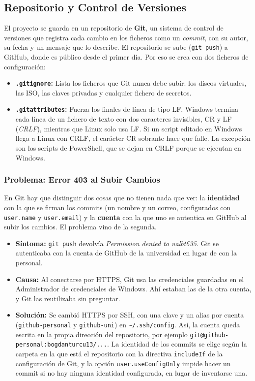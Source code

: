 \documentclass[11pt, a4paper, titlepage]{article}
\newcommand{\cod}[1]{\texttt{#1}}
\begin{document}
\subsection{Repositorio y Control de Versiones}

El proyecto se guarda en un repositorio de \textbf{Git}, un sistema de control de versiones que registra cada cambio en los ficheros como un \textit{commit}, con su autor, su fecha y un mensaje que lo describe. El repositorio se sube (\cod{git push}) a GitHub, donde es público desde el primer día. Por eso se crea con dos ficheros de configuración:

\begin{itemize}
    \item \textbf{\cod{.gitignore}:} Lista los ficheros que Git nunca debe subir: los discos virtuales, las ISO, las claves privadas y cualquier fichero de secretos.
    \item \textbf{\cod{.gitattributes}:} Fuerza los finales de línea de tipo LF. Windows termina cada línea de un fichero de texto con dos caracteres invisibles, CR y LF (\textit{CRLF}), mientras que Linux solo usa LF. Si un script editado en Windows llega a Linux con CRLF, el carácter CR sobrante hace que falle. La excepción son los scripts de PowerShell, que se dejan en CRLF porque se ejecutan en Windows.
\end{itemize}

\subsubsection{Problema: Error 403 al Subir Cambios}

En Git hay que distinguir dos cosas que no tienen nada que ver: la \textbf{identidad} con la que se firman los commits (un nombre y un correo, configurados con \cod{user.name} y \cod{user.email}) y la \textbf{cuenta} con la que uno se autentica en GitHub al subir los cambios. El problema vino de la segunda.

\begin{itemize}
    \item \textbf{Síntoma:} \cod{git push} devolvía \textit{Permission denied to ualbt635}. Git se autenticaba con la cuenta de GitHub de la universidad en lugar de con la personal.
    \item \textbf{Causa:} Al conectarse por HTTPS, Git usa las credenciales guardadas en el Administrador de credenciales de Windows. Ahí estaban las de la otra cuenta, y Git las reutilizaba sin preguntar.
    \item \textbf{Solución:} Se cambió HTTPS por SSH, con una clave y un alias por cuenta (\cod{github-personal} y \cod{github-uni}) en \cod{\textasciitilde/.ssh/config}. Así, la cuenta queda escrita en la propia dirección del repositorio, por ejemplo \cod{git@github-personal:\allowbreak bogdanturcu13/...}. La identidad de los commits se elige según la carpeta en la que está el repositorio con la directiva \cod{includeIf} de la configuración de Git, y la opción \cod{user.useConfigOnly} impide hacer un commit si no hay ninguna identidad configurada, en lugar de inventarse una.
\end{itemize}
\end{document}
